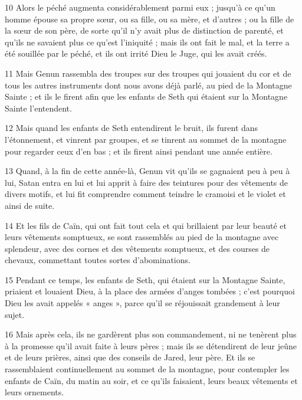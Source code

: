 \par 10 Alors le péché augmenta considérablement parmi eux ; jusqu'à ce qu'un homme épouse sa propre sœur, ou sa fille, ou sa mère, et d'autres ; ou la fille de la sœur de son père, de sorte qu'il n'y avait plus de distinction de parenté, et qu'ils ne savaient plus ce qu'est l'iniquité ; mais ils ont fait le mal, et la terre a été souillée par le péché, et ils ont irrité Dieu le Juge, qui les avait créés.

\par 11 Mais Genun rassembla des troupes sur des troupes qui jouaient du cor et de tous les autres instruments dont nous avons déjà parlé, au pied de la Montagne Sainte ; et ils le firent afin que les enfants de Seth qui étaient sur la Montagne Sainte l'entendent.

\par 12 Mais quand les enfants de Seth entendirent le bruit, ils furent dans l'étonnement, et vinrent par groupes, et se tinrent au sommet de la montagne pour regarder ceux d'en bas ; et ils firent ainsi pendant une année entière.

\par 13 Quand, à la fin de cette année-là, Genun vit qu'ils se gagnaient peu à peu à lui, Satan entra en lui et lui apprit à faire des teintures pour des vêtements de divers motifs, et lui fit comprendre comment teindre le cramoisi et le violet et ainsi de suite.

\par 14 Et les fils de Caïn, qui ont fait tout cela et qui brillaient par leur beauté et leurs vêtements somptueux, se sont rassemblés au pied de la montagne avec splendeur, avec des cornes et des vêtements somptueux, et des courses de chevaux, commettant toutes sortes d'abominations.

\par 15 Pendant ce temps, les enfants de Seth, qui étaient sur la Montagne Sainte, priaient et louaient Dieu, à la place des armées d'anges tombées ; c'est pourquoi Dieu les avait appelés « anges », parce qu'il se réjouissait grandement à leur sujet.

\par 16 Mais après cela, ils ne gardèrent plus son commandement, ni ne tenèrent plus à la promesse qu'il avait faite à leurs pères ; mais ils se détendirent de leur jeûne et de leurs prières, ainsi que des conseils de Jared, leur père. Et ils se rassemblaient continuellement au sommet de la montagne, pour contempler les enfants de Caïn, du matin au soir, et ce qu'ils faisaient, leurs beaux vêtements et leurs ornements.


